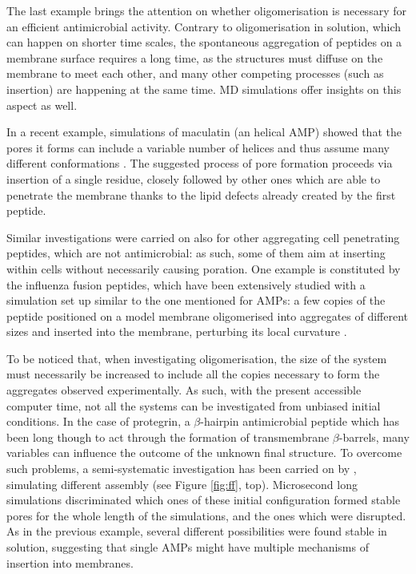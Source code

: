 The last example brings the attention on whether oligomerisation is necessary for an efficient antimicrobial activity. Contrary to oligomerisation in solution, which can happen on shorter time scales, the spontaneous aggregation of peptides on a membrane surface requires a long time, as the structures must diffuse on the membrane to meet each other, and many other competing processes (such as insertion) are happening at the same time. MD simulations offer insights on this aspect as well.

In a recent example, simulations of maculatin (an helical AMP) showed that the pores it forms can include a variable number of helices and thus assume many different conformations \citep{Wang2016}. The suggested process of pore formation proceeds via insertion of a single residue, closely followed by other ones which are able to penetrate the membrane thanks to the lipid defects already created by the first peptide.

Similar investigations were carried on also for other aggregating cell penetrating peptides, which are not antimicrobial: as such, some of them aim at inserting within cells without necessarily causing poration. One example is constituted by the influenza fusion peptides, which have been extensively studied with a simulation set up similar to the one mentioned for AMPs: a few copies of the peptide positioned on a model membrane oligomerised into aggregates of different sizes and inserted into the membrane, perturbing its local curvature \citep{Haria2014,Collu2015}.

To be noticed that, when investigating oligomerisation, the size of the system must necessarily be increased to include all the copies necessary to form the aggregates observed experimentally. As such, with the present accessible computer time, not all the systems can be investigated from unbiased initial conditions.
%
In the case of protegrin, a $\beta$-hairpin antimicrobial peptide which has been long though to act through the formation of transmembrane $\beta$-barrels, many variables can influence the outcome of the unknown final structure.
%
%
To overcome such problems, a semi-systematic investigation has been carried on by \citet{Lipkin2017}, simulating different assembly (see Figure \ref{fig:ff}, top).
%
Microsecond long simulations discriminated which ones of these initial configuration formed stable pores for the whole length of the simulations, and the ones which were disrupted. As in the previous example, several different possibilities were found stable in solution, suggesting that single AMPs might have multiple mechanisms of insertion into membranes.

